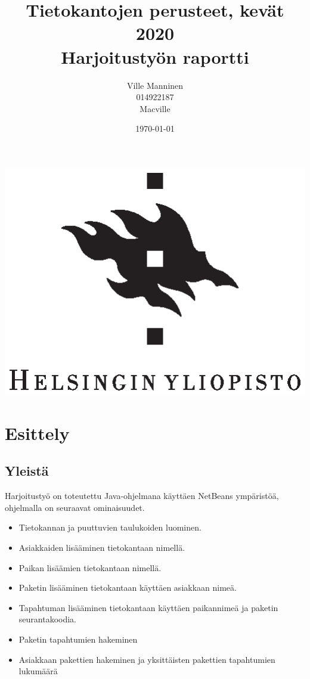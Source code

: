 \documentclass[12pt,a4paper]{article}
\begin{document}
\title{Tietokantojen perusteet, kevät 2020 \\
Harjoitustyön raportti}
\author{Ville Manninen \\014922187 \\Macville}
\date{\today}
\clearpage\maketitle
\begin{center}
\vspace{2cm}
\includegraphics{university-of-helsinki-2.eps} 
\end{center}
\thispagestyle{empty}

\newpage
\tableofcontents
\newpage
\section{Esittely}
\subsection*{Yleistä}
Harjoitustyö on toteutettu Java-ohjelmana käyttäen NetBeans ympäristöä, ohjelmalla on seuraavat ominaisuudet.
\begin{itemize}
\item Tietokannan ja puuttuvien taulukoiden luominen.
\item Asiakkaiden lisääminen tietokantaan nimellä.
\item Paikan lisäämien tietokantaan nimellä.
\item Paketin lisääminen tietokantaan käyttäen asiakkaan nimeä.
\item Tapahtuman lisääminen tietokantaan käyttäen paikannimeä ja paketin seurantakoodia.
\item Paketin tapahtumien hakeminen
\item Asiakkaan pakettien hakeminen ja yksittäisten pakettien tapahtumien lukumäärä
\end{itemize}
\end{document}
